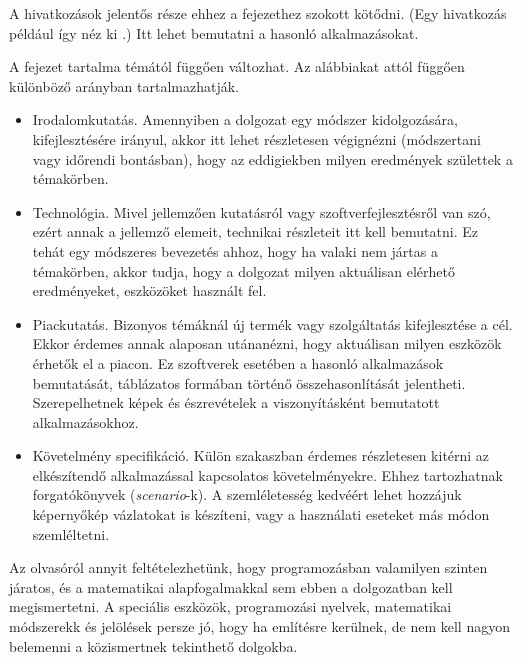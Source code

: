 A hivatkozások jelentős része ehhez a fejezethez szokott kötődni.
(Egy hivatkozás például így néz ki \cite{coombs1987markup}.)
Itt lehet bemutatni a hasonló alkalmazásokat.


A fejezet tartalma témától függően változhat. Az alábbiakat attól függően különböző arányban tartalmazhatják.
\begin{itemize}
\item Irodalomkutatás. Amennyiben a dolgozat egy módszer kidolgozására, kifejlesztésére irányul, akkor itt lehet részletesen végignézni (módszertani vagy időrendi bontásban), hogy az eddigiekben milyen eredmények születtek a témakörben.
\item Technológia. Mivel jellemzően kutatásról vagy szoftverfejlesztésről van szó, ezért annak a jellemző elemeit, technikai részleteit itt kell bemutatni.
Ez tehát egy módszeres bevezetés ahhoz, hogy ha valaki nem jártas a témakörben, akkor tudja, hogy a dolgozat milyen aktuálisan elérhető eredményeket, eszközöket használt fel.
\item Piackutatás. Bizonyos témáknál új termék vagy szolgáltatás kifejlesztése a cél.
Ekkor érdemes annak alaposan utánanézni, hogy aktuálisan milyen eszközök érhetők el a piacon.
Ez szoftverek esetében a hasonló alkalmazások bemutatását, táblázatos formában történő összehasonlítását jelentheti.
Szerepelhetnek képek és észrevételek a viszonyításként bemutatott alkalmazásokhoz.
\item Követelmény specifikáció. Külön szakaszban érdemes részletesen kitérni az elkészítendő alkalmazással kapcsolatos követelményekre.
Ehhez tartozhatnak forgatókönyvek (\textit{scenario}-k).
A szemléletesség kedvéért lehet hozzájuk képernyőkép vázlatokat is készíteni, vagy a használati eseteket más módon szemléltetni.
\end{itemize}


Az olvasóról annyit feltételezhetünk, hogy programozásban valamilyen szinten járatos, és a matematikai alapfogalmakkal sem ebben a dolgozatban kell megismertetni.
A speciális eszközök, programozási nyelvek, matematikai módszerekk és jelölések persze jó, hogy ha említésre kerülnek, de nem kell nagyon belemenni a közismertnek tekinthető dolgokba.
